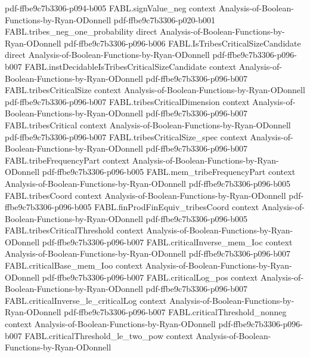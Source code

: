 \begin{theorem}
  {pdf-ffbe9c7b3306-p094-b005}
\proofstep
  {FABL.signValue_neg}
  {context}
  {Analysis-of-Boolean-Functions-by-Ryan-ODonnell}
  {pdf-ffbe9c7b3306-p020-b001}
\proofstep
  {FABL.tribes_neg_one_probability}
  {direct}
  {Analysis-of-Boolean-Functions-by-Ryan-ODonnell}
  {pdf-ffbe9c7b3306-p096-b006}
\proofstep
  {FABL.IsTribesCriticalSizeCandidate}
  {direct}
  {Analysis-of-Boolean-Functions-by-Ryan-ODonnell}
  {pdf-ffbe9c7b3306-p096-b007}
\proofstep
  {FABL.instDecidableIsTribesCriticalSizeCandidate}
  {context}
  {Analysis-of-Boolean-Functions-by-Ryan-ODonnell}
  {pdf-ffbe9c7b3306-p096-b007}
\proofstep
  {FABL.tribesCriticalSize}
  {context}
  {Analysis-of-Boolean-Functions-by-Ryan-ODonnell}
  {pdf-ffbe9c7b3306-p096-b007}
\proofstep
  {FABL.tribesCriticalDimension}
  {context}
  {Analysis-of-Boolean-Functions-by-Ryan-ODonnell}
  {pdf-ffbe9c7b3306-p096-b007}
\proofstep
  {FABL.tribesCritical}
  {context}
  {Analysis-of-Boolean-Functions-by-Ryan-ODonnell}
  {pdf-ffbe9c7b3306-p096-b007}
\proofstep
  {FABL.tribesCriticalSize_spec}
  {context}
  {Analysis-of-Boolean-Functions-by-Ryan-ODonnell}
  {pdf-ffbe9c7b3306-p096-b007}
\proofstep
  {FABL.tribeFrequencyPart}
  {context}
  {Analysis-of-Boolean-Functions-by-Ryan-ODonnell}
  {pdf-ffbe9c7b3306-p096-b005}
\proofstep
  {FABL.mem_tribeFrequencyPart}
  {context}
  {Analysis-of-Boolean-Functions-by-Ryan-ODonnell}
  {pdf-ffbe9c7b3306-p096-b005}
\proofstep
  {FABL.tribesCoord}
  {context}
  {Analysis-of-Boolean-Functions-by-Ryan-ODonnell}
  {pdf-ffbe9c7b3306-p096-b005}
\proofstep
  {FABL.finProdFinEquiv_tribesCoord}
  {context}
  {Analysis-of-Boolean-Functions-by-Ryan-ODonnell}
  {pdf-ffbe9c7b3306-p096-b005}
\proofstep
  {FABL.tribesCriticalThreshold}
  {context}
  {Analysis-of-Boolean-Functions-by-Ryan-ODonnell}
  {pdf-ffbe9c7b3306-p096-b007}
\proofstep
  {FABL.criticalInverse_mem_Ioc}
  {context}
  {Analysis-of-Boolean-Functions-by-Ryan-ODonnell}
  {pdf-ffbe9c7b3306-p096-b007}
\proofstep
  {FABL.criticalBase_mem_Ioo}
  {context}
  {Analysis-of-Boolean-Functions-by-Ryan-ODonnell}
  {pdf-ffbe9c7b3306-p096-b007}
\proofstep
  {FABL.criticalLog_pos}
  {context}
  {Analysis-of-Boolean-Functions-by-Ryan-ODonnell}
  {pdf-ffbe9c7b3306-p096-b007}
\proofstep
  {FABL.criticalInverse_le_criticalLog}
  {context}
  {Analysis-of-Boolean-Functions-by-Ryan-ODonnell}
  {pdf-ffbe9c7b3306-p096-b007}
\proofstep
  {FABL.criticalThreshold_nonneg}
  {context}
  {Analysis-of-Boolean-Functions-by-Ryan-ODonnell}
  {pdf-ffbe9c7b3306-p096-b007}
\proofstep
  {FABL.criticalThreshold_le_two_pow}
  {context}
  {Analysis-of-Boolean-Functions-by-Ryan-ODonnell}

\end{theorem}
